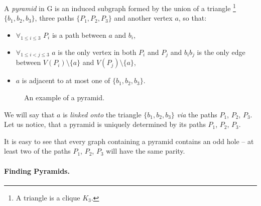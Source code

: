 A \emph{pyramid} in G is an induced subgraph formed by the union of a triangle \footnote{A triangle is a clique $K_3$.} $\{b_1,b_2,b_3\}$, three paths $\{P_1, P_2, P_3\}$ and another vertex $a$, so that:

\begin{minipage}{0.60\textwidth}
\begin{itemize}
	\item $\forall_{1\leq i \leq 3}$ $P_i$ is a path between $a$ and $b_i$,
	\item $\forall_{1\leq i < j \leq 3}$ $a$ is the only vertex in both $P_i$ and $P_j$ and $b_ib_j$ is the only edge between $V(P_i)\setminus\{a\}$ and $V(P_j)\setminus\{a\}$,
	\item $a$ is adjacent to at most one of $\{b_1, b_2, b_3\}$.
\end{itemize}
\end{minipage}%
\begin{wrapfigure}{r}{0.32\textwidth}
	\vspace{-2.5cm}
	
	\caption{An example  of a pyramid.}%
	\vspace{-1.2cm}
\end{wrapfigure}

We will say that $a$ is \emph{linked onto} the triangle $\{b_1, b_2, b_3\}$ \emph{via} the paths $P_1$, $P_2$, $P_3$. Let us notice, that a pyramid is uniquely determined by its paths $P_1$, $P_2$, $P_3$.

It is easy to see that every graph containing a pyramid contains an odd hole -- at least two of the paths $P_1$, $P_2$, $P_3$ will have the same parity.

\paragraph{Finding Pyramids.}

